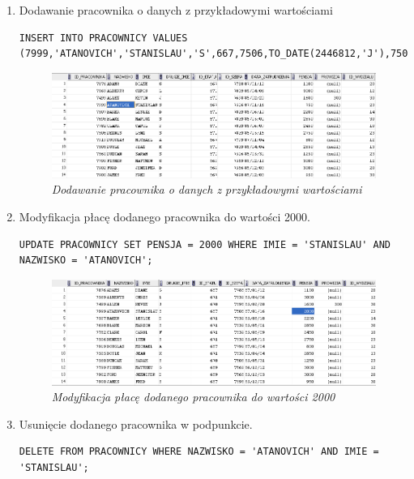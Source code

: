 \documentclass[a4paper, 10pt]{article}
\begin{document}
\begin{enumerate}
\item Dodawanie pracownika o danych z przykładowymi wartościami
\begin{lstlisting}[style=SQL,caption=\textit{Dodawanie pracownika o danych z przykładowymi wartościami}]
INSERT INTO PRACOWNICY VALUES (7999,'ATANOVICH','STANISLAU','S',667,7506,TO_DATE(2446812,'J'),750,NULL,23);
\end{lstlisting}

\begin{figure}[H]
	\centering 
	\includegraphics[scale=0.7]{zadanie7.png}
	\caption{\textit{Dodawanie pracownika o danych z przykładowymi wartościami}}
	\label{fig:dodawanie_pracownika}
\end{figure}

\item Modyfikacja płacę dodanego pracownika do wartości 2000. 
\begin{lstlisting}[style=SQL, caption=\textit{Modyfikacja płacę dodanego pracownika do wartości 2000}]
UPDATE PRACOWNICY SET PENSJA = 2000 WHERE IMIE = 'STANISLAU' AND NAZWISKO = 'ATANOVICH';
\end{lstlisting}

\begin{figure}[H]
	\centering 
	\includegraphics[scale=0.7]{zadanie8.png}
	\caption{\textit{Modyfikacja płacę dodanego pracownika do wartości 2000}}
	\label{fig:modyfikacja_pracownika}
\end{figure}

\item Usunięcie dodanego pracownika w podpunkcie. 
\begin{lstlisting}[style=SQL, caption=\textit{Usunięcie dodanego pracownika}]
DELETE FROM PRACOWNICY WHERE NAZWISKO = 'ATANOVICH' AND IMIE = 'STANISLAU';
\end{lstlisting}


\end{enumerate}
\end{document}
